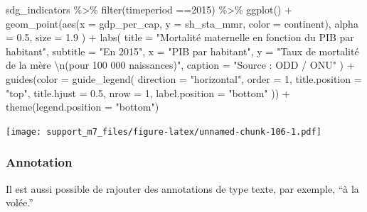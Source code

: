 \documentclass[
]{book}
\newenvironment{Shaded}{\begin{snugshade}}{\end{snugshade}}
\newcommand{\AttributeTok}[1]{\textcolor[rgb]{0.77,0.63,0.00}{#1}}
\newcommand{\DecValTok}[1]{\textcolor[rgb]{0.00,0.00,0.81}{#1}}
\newcommand{\FloatTok}[1]{\textcolor[rgb]{0.00,0.00,0.81}{#1}}
\newcommand{\FunctionTok}[1]{\textcolor[rgb]{0.00,0.00,0.00}{#1}}
\newcommand{\NormalTok}[1]{#1}
\newcommand{\SpecialCharTok}[1]{\textcolor[rgb]{0.00,0.00,0.00}{#1}}
\newcommand{\StringTok}[1]{\textcolor[rgb]{0.31,0.60,0.02}{#1}}
\begin{document}
\begin{Shaded}
\begin{Highlighting}[]
\NormalTok{sdg\_indicators }\SpecialCharTok{\%\textgreater{}\%} 
  \FunctionTok{filter}\NormalTok{(timeperiod }\SpecialCharTok{==}\DecValTok{2015}\NormalTok{) }\SpecialCharTok{\%\textgreater{}\%} 
  \FunctionTok{ggplot}\NormalTok{() }\SpecialCharTok{+}
  \FunctionTok{geom\_point}\NormalTok{(}\FunctionTok{aes}\NormalTok{(}\AttributeTok{x =}\NormalTok{ gdp\_per\_cap, }
                 \AttributeTok{y =}\NormalTok{ sh\_sta\_mmr,}
                 \AttributeTok{color =}\NormalTok{ continent),}
    \AttributeTok{alpha =} \FloatTok{0.5}\NormalTok{, }
    \AttributeTok{size =} \FloatTok{1.9}
\NormalTok{  ) }\SpecialCharTok{+}
  \FunctionTok{labs}\NormalTok{(}
    \AttributeTok{title =} \StringTok{"Mortalité maternelle en fonction du PIB par habitant"}\NormalTok{,}
    \AttributeTok{subtitle =} \StringTok{"En 2015"}\NormalTok{,}
    \AttributeTok{x =} \StringTok{"PIB par habitant"}\NormalTok{,}
    \AttributeTok{y =} \StringTok{"Taux de mortalité de la mère }\SpecialCharTok{\textbackslash{}n}\StringTok{(pour 100 000 naissances)"}\NormalTok{,}
    \AttributeTok{caption =} \StringTok{"Source : ODD / ONU"}
\NormalTok{  ) }\SpecialCharTok{+}
  \FunctionTok{guides}\NormalTok{(}\AttributeTok{color =} \FunctionTok{guide\_legend}\NormalTok{(}
    \AttributeTok{direction =} \StringTok{"horizontal"}\NormalTok{,}
    \AttributeTok{order =} \DecValTok{1}\NormalTok{,}
    \AttributeTok{title.position =} \StringTok{"top"}\NormalTok{,}
    \AttributeTok{title.hjust =} \FloatTok{0.5}\NormalTok{,}
    \AttributeTok{nrow =} \DecValTok{1}\NormalTok{,}
    \AttributeTok{label.position =} \StringTok{"bottom"}
\NormalTok{  )) }\SpecialCharTok{+}
  \FunctionTok{theme}\NormalTok{(}\AttributeTok{legend.position =} \StringTok{"bottom"}\NormalTok{)}
\end{Highlighting}
\end{Shaded}

\texttt{[image: support\_m7\_files/figure-latex/unnamed-chunk-106-1.pdf]}

\hypertarget{annotation}{%
\subsubsection{Annotation}\label{annotation}}

Il est aussi possible de rajouter des annotations de type texte, par exemple, ``à la volée.''
\end{document}
